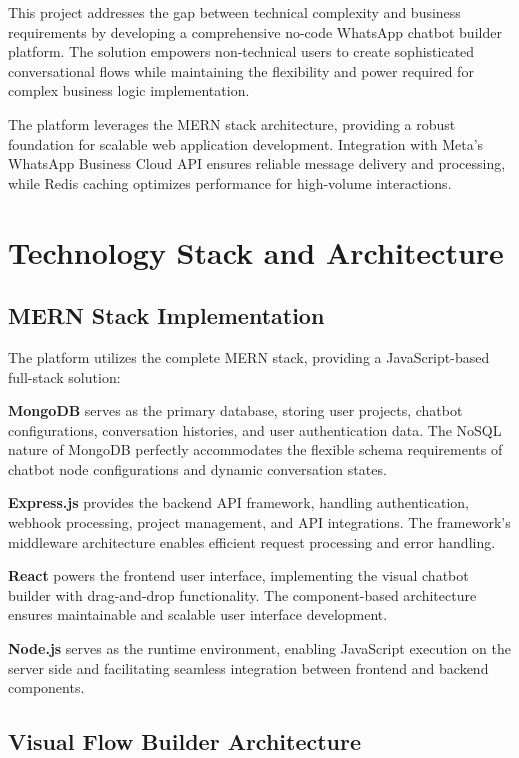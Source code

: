 \documentclass[conference]{IEEEtran}
\begin{document}
This project addresses the gap between technical complexity and business requirements by developing a comprehensive no-code WhatsApp chatbot builder platform. The solution empowers non-technical users to create sophisticated conversational flows while maintaining the flexibility and power required for complex business logic implementation.

The platform leverages the MERN stack architecture, providing a robust foundation for scalable web application development. Integration with Meta's WhatsApp Business Cloud API ensures reliable message delivery and processing, while Redis caching optimizes performance for high-volume interactions.

\section{Technology Stack and Architecture}

\subsection{MERN Stack Implementation}

The platform utilizes the complete MERN stack, providing a JavaScript-based full-stack solution:

\textbf{MongoDB} serves as the primary database, storing user projects, chatbot configurations, conversation histories, and user authentication data. The NoSQL nature of MongoDB perfectly accommodates the flexible schema requirements of chatbot node configurations and dynamic conversation states.

\textbf{Express.js} provides the backend API framework, handling authentication, webhook processing, project management, and API integrations. The framework's middleware architecture enables efficient request processing and error handling.

\textbf{React} powers the frontend user interface, implementing the visual chatbot builder with drag-and-drop functionality. The component-based architecture ensures maintainable and scalable user interface development.

\textbf{Node.js} serves as the runtime environment, enabling JavaScript execution on the server side and facilitating seamless integration between frontend and backend components.

\subsection{Visual Flow Builder Architecture}
\end{document}

